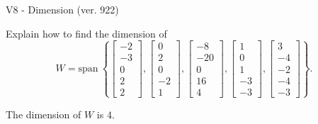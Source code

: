 \begin{exercise}
  \begin{exerciseTitle}V8 - Dimension (ver. 922)\end{exerciseTitle}
  \begin{exerciseStatement}
    Explain how to find the dimension of 
\[W=\mathrm{span}\ \left\{\left[\begin{array}{r}
-2 \\
-3 \\
0 \\
2 \\
2
\end{array}\right] , \left[\begin{array}{r}
0 \\
2 \\
0 \\
-2 \\
1
\end{array}\right] , \left[\begin{array}{r}
-8 \\
-20 \\
0 \\
16 \\
4
\end{array}\right] , \left[\begin{array}{r}
1 \\
0 \\
1 \\
-3 \\
-3
\end{array}\right] , \left[\begin{array}{r}
3 \\
-4 \\
-2 \\
-4 \\
-3
\end{array}\right]\right\}.\]



  \end{exerciseStatement}
  \begin{exerciseAnswer}
   The dimension of \(W\) is  \(4\).
  


  \end{exerciseAnswer}
\end{exercise}